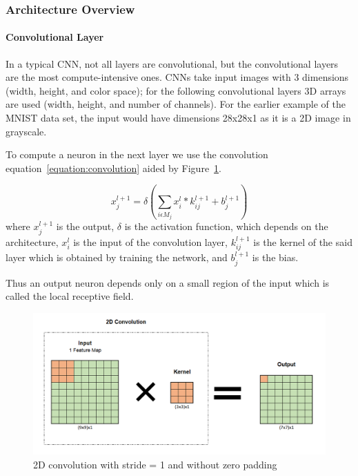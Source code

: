  \subsubsection{Architecture Overview}
 \label{section:Aoverview}


 \paragraph{Convolutional Layer}
\label{section:convlayer}

In a typical CNN, not all layers are convolutional, but the convolutional layers
are the most compute-intensive ones. CNNs take input images with 3 dimensions
(width, height, and color space); for the following convolutional layers 3D
arrays are used (width, height, and number of channels). For the earlier example
of the MNIST data set, the input would have dimensions 28x28x1 as it is a 2D
image in grayscale.

To compute a neuron in the next layer we use the convolution
equation~\ref{equation:convolution} aided by Figure~\ref{Cl}.

\begin{equation} \label{equation:convolution}
    \displaystyle x_{j}^{l+1}=\delta (\sum_{i \epsilon M_{j}}x_{i}^{l} * k_{ij}^{l+1}+ b_{j}^{l+1})
\end{equation}
where $x_{j}^{l+1}$ is the output, $\delta$ is the activation function, which
depends on the architecture, $x_{i}^{l}$ is the input of the convolution layer,
$k_{ij}^{l+1}$ is the kernel of the said layer which is obtained by training the
network, and $b_{j}^{l+1}$ is the bias.

Thus an output neuron depends only on a small region of the input which is
called the local receptive field.

\begin{figure}[!htbp]
    \centering
    \includegraphics[width=1\textwidth]{Figures/conv.png}
    \caption{2D convolution with stride = 1 and without zero padding}
    \label{Cl}
\end{figure} 


